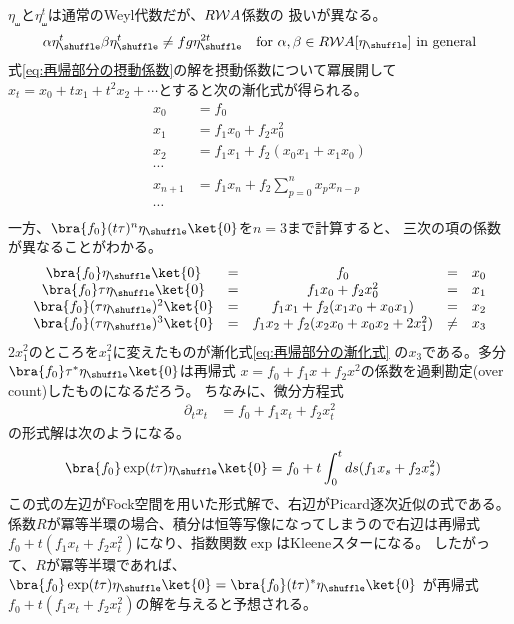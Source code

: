 	$\eta_\shuffle$と$\eta_\shuffle^t$は通常のWeyl代数だが、$R\mathcal{W}{A}$係数の
	扱いが異なる。
	\begin{equation*}\begin{split} %
		\alpha\eta_\shuffle^t \beta\eta_\shuffle^t \neq fg\eta_\shuffle^{2t}
		\quad\text{for }\alpha,\beta\in R\Word A[\eta_\shuffle]
		\text{ in general}
	\end{split}\end{equation*} %
	式\eqref{eq:再帰部分の摂動係数}の解を摂動係数について冪展開して
	$x_t=x_0+tx_1+t^2x_2+\cdots$とすると次の漸化式が得られる。
	\begin{equation}\label{eq:再帰部分の漸化式}\begin{split} %
		x_0 &= f_0 \\
		x_1 &= f_1x_0 + f_2x_0^2 \\
		x_2 &= f_1x_1 + f_2(x_0x_1 + x_1x_0) \\
		\cdots \\
		x_{n+1} &= f_1x_n + f_2\sum_{p=0}^nx_px_{n-p} \\
		\cdots \\
	\end{split}\end{equation} %
	一方、$\bra{f_0}(t\tau)^n\eta_\shuffle\ket{0}$を$n=3$まで計算すると、
	三次の項の係数が異なることがわかる。
	\begin{equation*}\begin{array}{ccccc} %
		\bra{f_0}\eta_\shuffle\ket{0} &=& f_0 &=& x_0 \\
		\bra{f_0}\tau\eta_\shuffle\ket{0} &=& f_1x_0 + f_2x_0^2 &=& x_1 \\
		\bra{f_0}(\tau\eta_\shuffle)^2\ket{0}
			&=& f_1x_1 + f_2(x_1x_0 + x_0x_1) &=& x_2 \\
		\bra{f_0}(\tau\eta_\shuffle)^3\ket{0}
			&=& f_1x_2 + f_2(x_2x_0 + x_0x_2 + 2x_1^2) &\neq& x_3 \\
	\end{array}\end{equation*} %
	$2x_1^2$のところを$x_1^2$に変えたものが漸化式\eqref{eq:再帰部分の漸化式}
	の$x_3$である。多分$\bra{f_0}\tau^*\eta_\shuffle\ket{0}$は再帰式
	$x=f_0+f_1x+f_2x^2$の係数を過剰勘定(over count)したものになるだろう。
	ちなみに、微分方程式
	\begin{equation*}\begin{split} %
		\partial_tx_t &= f_0 + f_1x_t + f_2x_t^2
	\end{split}\end{equation*} %
	の形式解は次のようになる。
	\begin{equation*}\begin{split} %
		\bra{f_0}\exp(t\tau)\eta_\shuffle\ket{0}
		&= f_0 + t\int_0^tds(f_1x_s+f_2x_s^2)
	\end{split}\end{equation*} %
	この式の左辺がFock空間を用いた形式解で、右辺がPicard逐次近似の式である。
	係数$R$が冪等半環の場合、積分は恒等写像になってしまうので右辺は再帰式
	$f_0+t(f_1x_t+f_2x_t^2)$になり、指数関数$\exp$はKleeneスターになる。
	したがって、$R$が冪等半環であれば、
	$\bra{f_0}\exp(t\tau)\eta_\shuffle\ket{0}
	=\bra{f_0}(t\tau)^*\eta_\shuffle\ket{0}$
	が再帰式$f_0+t(f_1x_t+f_2x_t^2)$の解を与えると予想される。

